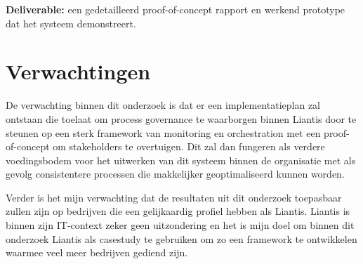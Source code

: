 \textbf{Deliverable:} een gedetailleerd proof-of-concept rapport en werkend prototype dat het systeem demonstreert.

\section{Verwachtingen}%
\label{sec:verwachtingen}
De verwachting binnen dit onderzoek is dat er een implementatieplan zal ontstaan die toelaat om process governance te waarborgen binnen Liantis door te steunen op een sterk framework van monitoring en orchestration met een proof-of-concept om stakeholders te overtuigen. Dit zal dan fungeren als verdere voedingsbodem voor het uitwerken van dit systeem binnen de organisatie met als gevolg consistentere processen die makkelijker geoptimaliseerd kunnen worden.

Verder is het mijn verwachting dat de resultaten uit dit onderzoek toepasbaar zullen zijn op bedrijven die een gelijkaardig profiel hebben als Liantis. Liantis is binnen zijn IT-context zeker geen uitzondering en het is mijn doel om binnen dit onderzoek Liantis als casestudy te gebruiken om zo een framework te ontwikkelen waarmee veel meer bedrijven gediend zijn.

